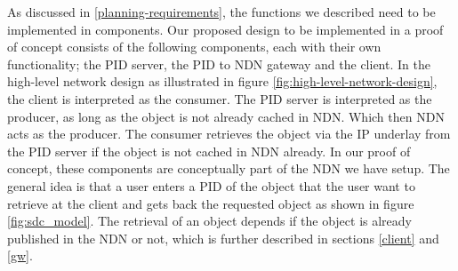 
As discussed in \ref{planning-requirements}, the functions we described need to be implemented in components. Our proposed design to be implemented in a proof of concept consists of the following components, each with their own functionality; the PID server, the PID to NDN gateway and the client. In the high-level network design as illustrated in figure \ref{fig:high-level-network-design}, the client is interpreted as the consumer. The PID server is interpreted as the producer, as long as the object is not already cached in NDN. Which then NDN acts as the producer. The consumer retrieves the object via the IP underlay from the PID server if the object is not cached in NDN already. In our proof of concept, these components are conceptually part of the NDN we have setup. The general idea is that a user enters a PID of the object that the user want to retrieve at the client and gets back the requested object as shown in figure \ref{fig:sdc_model}. The retrieval of an object depends if the object is already published in the NDN or not, which is further described in sections \ref{client} and \ref{gw}.



 


